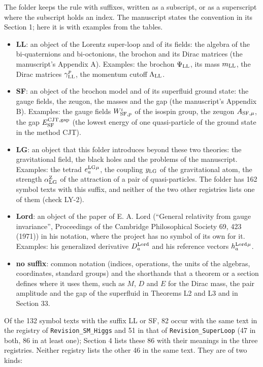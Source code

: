 \documentclass[
  10pt,
]{article}
\providecommand{\tightlist}{%
  \setlength{\itemsep}{0pt}\setlength{\parskip}{0pt}}
\begin{document}
The folder keeps the rule with suffixes, written as a subscript, or as a
superscript where the subscript holds an index. The manuscript states
the convention in its Section 1; here it is with examples from the
tables.

\begin{itemize}
\tightlist
\item
  \textbf{LL}: an object of the Lorentz super-loop and of its fields:
  the algebra of the bi-quaternions and bi-octonions, the brochon and
  its Dirac matrices (the manuscript's Appendix A). Examples: the
  brochon \(\Psi_{\rm LL}\), its mass \(m_{\rm LL}\), the Dirac matrices
  \(\gamma^p_{\rm LL}\), the momentum cutoff \(\Lambda_{\rm LL}\).
\item
  \textbf{SF}: an object of the brochon model and of its superfluid
  ground state: the gauge fields, the zeugon, the masses and the gap
  (the manuscript's Appendix B). Examples: the gauge fields
  \(W^\iota_{{\rm SF},p}\) of the isospin group, the zeugon
  \(A_{{\rm SF},\mu}\), the gap \(E^{\rm CJT,gap}_{\rm SF}\) (the lowest
  energy of one quasi-particle of the ground state in the method CJT).
\item
  \textbf{LG}: an object that this folder introduces beyond these two
  theories: the gravitational field, the black holes and the problems of
  the manuscript. Examples: the tetrad \(e^{\rm LG}_a{}^\mu\), the
  coupling \(y_{\rm LG}\) of the gravitational atom, the strength
  \(\alpha^{\rm Z}_{\rm LG}\) of the attraction of a pair of
  quasi-particles. The folder has 162 symbol texts with this suffix, and
  neither of the two other registries lists one of them (check LY-2).
\item
  \textbf{Lord}: an object of the paper of E. A. Lord (``General
  relativity from gauge invariance'', Proceedings of the Cambridge
  Philosophical Society 69, 423 (1971)) in his notation, where the
  project has no symbol of its own for it. Examples: his generalized
  derivative \(D^{\rm Lord}_a\) and his reference vectors
  \(h^{\rm Lord}_a{}^\mu\).
\item
  \textbf{no suffix}: common notation (indices, operations, the units of
  the algebras, coordinates, standard groups) and the shorthands that a
  theorem or a section defines where it uses them, such as \(M\), \(D\)
  and \(E\) for the Dirac mass, the pair amplitude and the gap of the
  superfluid in Theorems L2 and L3 and in Section 33.
\end{itemize}

Of the 132 symbol texts with the suffix LL or SF, 82 occur with the same
text in the registry of \texttt{Revision\_SM\_Higgs} and 51 in that of
\texttt{Revision\_SuperLoop} (47 in both, 86 in at least one); Section 4
lists these 86 with their meanings in the three registries. Neither
registry lists the other 46 in the same text. They are of two kinds:
\end{document}
